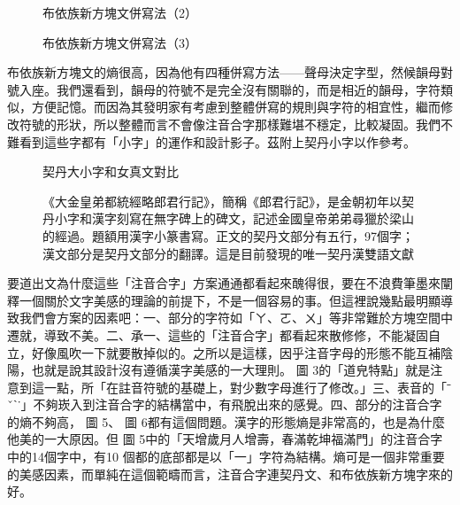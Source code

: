 \documentclass[a5paper, 12pt, openany]{book} %
\begin{document}
\begin{figure}[h]
\centering
\caption{布依族新方塊文併寫法（2）}
\end{figure}


\begin{figure}[h]
\centering
\caption{布依族新方塊文併寫法（3）}
\end{figure}



布依族新方塊文的熵很高，因為他有四種併寫方法——聲母決定字型，然候韻母對號入座。我們還看到，韻母的符號不是完全沒有關聯的，而是相近的韻母，字符類似，方便記憶。而因為其發明家有考慮到整體併寫的規則與字符的相宜性，繼而修改符號的形狀，所以整體而言不會像注音合字那樣難堪不穩定，比較凝固。我們不難看到這些字都有「小字」的運作和設計影子。茲附上契丹小字以作參考。

\begin{figure}[h]
\centering
\caption{契丹大小字和女真文對比}
\end{figure}


\begin{figure}[h]
\centering
\caption{《大金皇弟都統經略郎君行記》，簡稱《郎君行記》，是金朝初年以契丹小字和漢字刻寫在無字碑上的碑文，記述金國皇帝弟弟尋獵於梁山的經過。題額用漢字小篆書寫。正文的契丹文部分有五行，97個字；漢文部分是契丹文部分的翻譯。這是目前發現的唯一契丹漢雙語文獻}
\end{figure}





要道出文為什麼這些「注音合字」方案通通都看起來醜得很，要在不浪費筆墨來闡釋一個關於文字美感的理論的前提下，不是一個容易的事。但這裡說幾點最明顯導致我們會方案的因素吧：一、部分的字符如「ㄚ、ㄛ、ㄨ」等非常難於方塊空間中遷就，導致不美。二、承一、這些的「注音合字」都看起來散修修，不能凝固自立，好像風吹一下就要散掉似的。之所以是這樣，因乎注音字母的形態不能互補陰陽，也就是說其設計沒有遵循漢字美感的一大理則。
圖 3的「道皃特點」就是注意到這一點，所「在註音符號的基礎上，對少數字母進行了修改。」三、表音的「ˉ ˇˋ˙」不夠崁入到注音合字的結構當中，有飛脫出來的感覺。四、部分的注音合字的熵不夠高，
圖 5、
圖 6都有這個問題。漢字的形態熵是非常高的，也是為什麼他美的一大原因。但
圖 5中的「天增歲月人增壽，春滿乾坤福滿門」的注音合字中的14個字中，有10 個都的底部都是以「一」字符為結構。熵可是一個非常重要的美感因素，而單純在這個範疇而言，注音合字連契丹文、和布依族新方塊字來的好。
\end{document}
